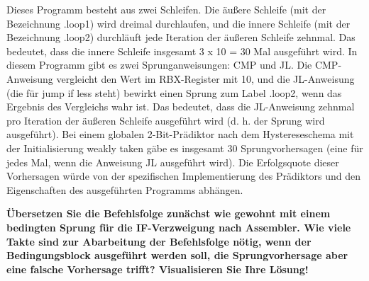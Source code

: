 \documentclass[11pt]{article}
\newcommand{\aufgabe}[1]{\item{\bf #1}}
\begin{document}
Dieses Programm besteht aus zwei Schleifen. Die äußere Schleife (mit der Bezeichnung .loop1) wird dreimal durchlaufen, und die innere Schleife (mit der Bezeichnung .loop2) durchläuft jede Iteration der äußeren Schleife zehnmal. Das bedeutet, dass die innere Schleife insgesamt 3 x 10 = 30 Mal ausgeführt wird. In diesem Programm gibt es zwei Sprunganweisungen: CMP und JL. Die CMP-Anweisung vergleicht den Wert im RBX-Register mit 10, und die JL-Anweisung (die für \glqq jump if less\grqq{} steht) bewirkt einen Sprung zum Label .loop2, wenn das Ergebnis des Vergleichs wahr ist. Das bedeutet, dass die JL-Anweisung zehnmal pro Iteration der äußeren Schleife ausgeführt wird (d. h. der Sprung wird ausgeführt). Bei einem globalen 2-Bit-Prädiktor nach dem Hystereseschema mit der Initialisierung \glqq weakly taken\grqq{} gäbe es insgesamt 30 Sprungvorhersagen (eine für jedes Mal, wenn die Anweisung JL ausgeführt wird). Die Erfolgsquote dieser Vorhersagen würde von der spezifischen Implementierung des Prädiktors und den Eigenschaften des ausgeführten Programms abhängen.
\aufgabe{Übersetzen Sie die Befehlsfolge zunächst wie gewohnt mit einem bedingten Sprung für die IF-Verzweigung nach Assembler. Wie viele Takte sind zur Abarbeitung der Befehlsfolge nötig, wenn der Bedingungsblock ausgeführt werden soll, die Sprungvorhersage aber eine falsche Vorhersage trifft? Visualisieren Sie Ihre Lösung!}

\end{document}
